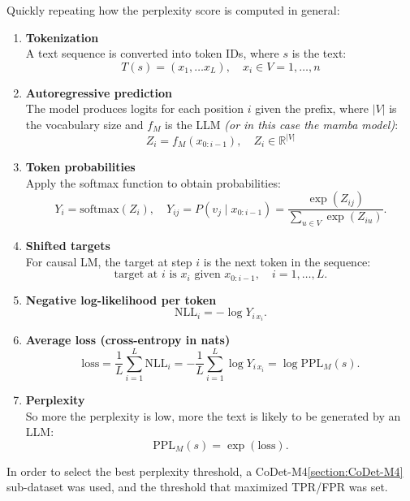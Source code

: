 Quickly repeating how the perplexity score is computed in general:
\begin{enumerate}
    \item \textbf{Tokenization} \\
    A text sequence is converted into token IDs, where $s$ is the text:
    \[
        T(s) = (x_1, \dots x_L), \quad  x_i \in V = {1, \dots, n}
    \]

    \item \textbf{Autoregressive prediction} \\
    The model produces logits for each position $i$ given the prefix, 
    where $|V|$ is the vocabulary size and $f_M$ is the 
    LLM \textit{(or in this case the mamba model)}:
    \[
        Z_i = f_M(x_{0:i-1}), \quad Z_i \in \mathbb{R}^{|V|}
    \]

    \item \textbf{Token probabilities} \\
    Apply the softmax function to obtain probabilities:
    \[
        Y_i=\mathrm{softmax}(Z_i), \quad
        Y_{ij}=P(v_j \mid x_{0:i-1})=\frac{\exp(Z_{ij})}{\sum_{u\in V}\exp(Z_{iu})}.
    \]

    \item \textbf{Shifted targets} \\
    For causal LM, the target at step $i$ is the next token in the sequence:
    \[
        \text{target at } i \text{ is } x_i \text{ given } x_{0:i-1}, \quad i=1,\dots,L.
    \]

    \item \textbf{Negative log-likelihood per token} \\
    \[
        \mathrm{NLL}_i = -\log Y_{i\,x_i}.
    \]

    \item \textbf{Average loss (cross-entropy in nats)} \\
    \[
        \mathrm{loss}=\frac{1}{L}\sum_{i=1}^{L}\mathrm{NLL}_i
        =-\frac{1}{L}\sum_{i=1}^{L}\log Y_{i\,x_i}
        =\log\mathrm{PPL}_M(s).
    \]

    \item \textbf{Perplexity} \\
    So more the perplexity is low, more the text is likely to be generated by an LLM:
    \[
        \mathrm{PPL}_M(s)=\exp(\mathrm{loss}).
    \]
\end{enumerate}

In order to select the best perplexity threshold, 
a CoDet-M4\ref{section:CoDet-M4} sub-dataset was used, and the threshold that 
maximized TPR/FPR was set.


